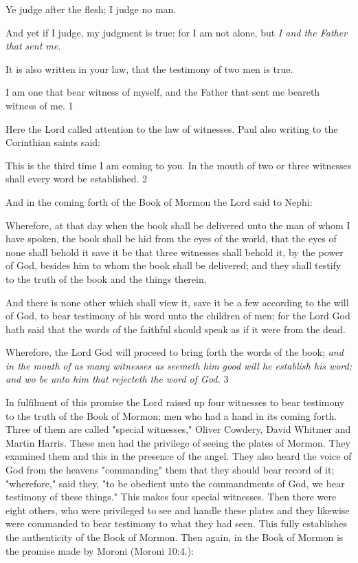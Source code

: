 Ye judge after the flesh; I judge no man.

And yet if I judge, my judgment is true: for I am not alone, but \textit{I and the Father that sent me.}

It is also written in your law, that the testimony of two men is true.

I am one that bear witness of myself, and the Father that sent me beareth witness of me. 1

Here the Lord called attention to the law of witnesses. Paul also writing to the Corinthian
saints said:

This is the third time I am coming to you. In the mouth of two or three witnesses shall every
word be established. 2

And in the coming forth of the Book of Mormon the Lord said to Nephi:

Wherefore, at that day when the book shall be delivered unto the man of whom I have
spoken, the book shall be hid from the eyes of the world, that the eyes of none shall behold it
save it be that three witnesses shall behold it, by the power of God, besides him to whom the
book shall be delivered; and they shall testify to the truth of the book and the things therein.

And there is none other which shall view it, save it be a few according to the will of God, to
bear testimony of his word unto the children of men; for the Lord God hath said that the
words of the faithful should speak as if it were from the dead.

Wherefore, the Lord God will proceed to bring forth the words of the book; \textit{and in the mouth
of as many witnesses as seemeth him good will he establish his word; and wo be unto him
that rejecteth the word of God.} 3

In fulfilment of this promise the Lord raised up four witnesses to bear testimony to the truth
of the Book of Mormon; men who had a hand in its coming forth. Three of them are called
"special witnesses," Oliver Cowdery, David Whitmer and Martin Harris. These men had the
privilege of seeing the plates of Mormon. They examined them and this in the presence of the
angel. They also heard the voice of God from the heavens "commanding" them that they
should bear record of it; "wherefore," said they, "to be obedient unto the commandments of
God, we bear testimony of these things." This makes four special witnesses. Then there were
eight others, who were privileged to see and handle these plates and they likewise were
commanded to bear testimony to what they had seen. This fully establishes the authenticity
of the Book of Mormon. Then again, in the Book of Mormon is the promise made by Moroni
(Moroni 10:4.):

